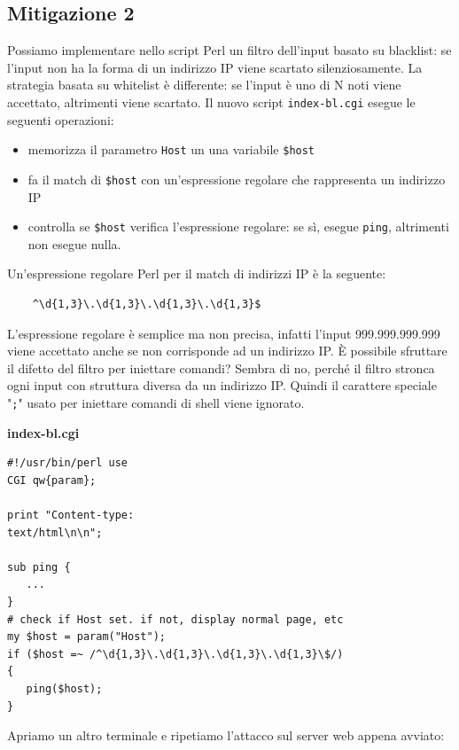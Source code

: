 \subsection{Mitigazione 2}
Possiamo implementare nello script Perl un filtro dell'input basato su blacklist: se l'input non ha la forma di un indirizzo IP viene scartato silenziosamente. La strategia basata su whitelist è differente: se l'input è uno di N noti viene accettato, altrimenti viene scartato. Il nuovo script \texttt{index-bl.cgi} esegue le seguenti operazioni:
\begin{itemize}
    \item memorizza il parametro \texttt{Host} un una variabile \texttt{\$host}
    \item fa il match di \texttt{\$host} con un'espressione regolare che rappresenta un indirizzo IP
    \item controlla se \texttt{\$host} verifica l'espressione regolare: se sì, esegue \texttt{ping}, altrimenti non esegue nulla.
\end{itemize}
Un'espressione regolare Perl per il match di indirizzi IP è la seguente:
\begin{center}
    \begin{lstlisting}
    ^\d{1,3}\.\d{1,3}\.\d{1,3}\.\d{1,3}$
    \end{lstlisting}
\end{center}
L'espressione regolare è semplice ma non precisa, infatti l'input 999.999.999.999 viene accettato anche se non corrisponde ad un indirizzo IP. È possibile sfruttare il difetto del filtro per iniettare comandi? Sembra di no, perché il filtro stronca ogni input con struttura diversa da un indirizzo IP. Quindi il carattere speciale "\texttt{;}" usato per iniettare comandi di shell viene ignorato.

\begin{mdframed}[backgroundcolor=white!20,shadow=false]
\textbf{index-bl.cgi}
\begin{verbatim}
#!/usr/bin/perl use
CGI qw{param};

print "Content-type:
text/html\n\n";

sub ping {
   ...
}
# check if Host set. if not, display normal page, etc
my $host = param("Host");
if ($host =~ /^\d{1,3}\.\d{1,3}\.\d{1,3}\.\d{1,3}\$/)
{ 
   ping($host);
}
\end{verbatim}
\end{mdframed}

Apriamo un altro terminale e ripetiamo l'attacco sul server web appena avviato:

